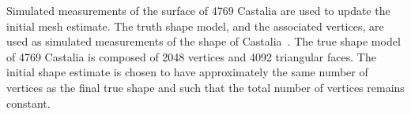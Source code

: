 Simulated measurements of the surface of 4769 Castalia are used to update the initial mesh estimate.
The truth shape model, and the associated vertices, are used as simulated measurements of the shape of Castalia~\cite{neese2004}.
The true shape model of 4769 Castalia is composed of \num{2048} vertices and \num{4092} triangular faces.
The initial shape estimate is chosen to have approximately the same number of vertices as the final true shape and such that the total number of vertices remains constant.
\begin{figure}[htbp]
    \centering
    ~

    ~


\end{figure}
